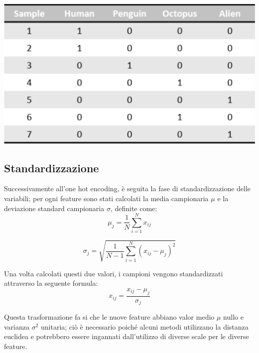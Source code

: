\documentclass[a4paper,8pt]{article}
\newenvironment{Figure}
  {\par\medskip\noindent\minipage{\linewidth}}
  {\endminipage\par\medskip}
\begin{document}
\begin{multicols}{2}
\begin{Figure}
 \centering
 \includegraphics[width=\linewidth]{categvecbw}
\end{Figure}

\subsection{Standardizzazione}
Successivamente all'one hot encoding, è seguita la fase di standardizzazione delle variabili; per ogni feature sono stati calcolati la media campionaria $\mu$ e la deviazione standard campionaria $\sigma$, definite come: 
\begin{equation}
	\mu_{j} = \frac{1}{N}\sum_{i=1}^{N} x_{ij}
\end{equation}
 
\begin{equation}
	\sigma_{j} = \sqrt{\frac{1}{N-1}\sum_{i=1}^{N}(x_{ij} - \mu_{j})^2}
\end{equation} 

Una volta calcolati questi due valori, i campioni vengono standardizzati attraverso la seguente formula:
\begin{equation}
	x_{ij} = \frac{x_{ij} - \mu_{j}}{\sigma_{j}}
\end{equation}

Questa trasformazione fa si che le nuove feature abbiano valor medio $\mu$ nullo e varianza $\sigma^2$ unitaria;  ciò è necessario poiché alcuni metodi utilizzano la distanza euclidea e potrebbero essere ingannati dall'utilizzo di diverse scale per le diverse feature. %


\end{multicols}
\end{document}
